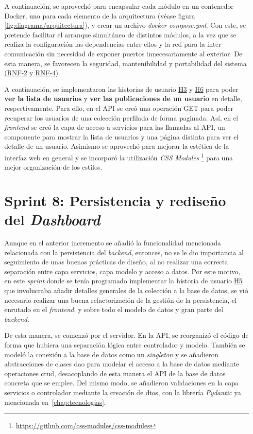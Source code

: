 A continuación, se aprovechó para encapsular cada módulo en un contenedor Docker, uno para cada elemento de la arquitectura (véase figura \ref{fig:diagrama/arquitectura}), y crear un archivo \textit{docker-compose.yml}. Con este, se pretende facilitar el arranque simultáneo de distintos módulos, a la vez que se realiza la configuración las dependencias entre ellos y la red para la inter-comunicación sin necesidad de exponer puertos innecesariamente al exterior. De esta manera, se favorecen la seguridad, mantenibilidad y portabilidad del sistema (\hyperref[tab:rnf]{RNF-2} y \hyperref[tab:rnf]{RNF-4}).

A continuación, se implementaron las historias de usuario \hyperref[tab:user-stories]{H3} y \hyperref[tab:user-stories]{H6} para poder \textbf{ver la lista de usuarios} y \textbf{ver las publicaciones de un usuario} en detalle, respectivamente. Para ello, en el API se creó una operación GET para poder recuperar los usuarios de una colección perfilada de forma paginada. Así, en el \textit{frontend} se creó la capa de acceso a servicios para las llamadas al API, un componente para mostrar la lista de usuarios y una página distinta para ver el detalle de un usuario. Asimismo se aprovechó para mejorar la estética de la interfaz web en general y se incorporó la utilización \textit{CSS Modules} \footnote{\url{https://github.com/css-modules/css-modules}} para una mejor organización de los estilos.

\section{Sprint 8: Persistencia y rediseño del \textit{Dashboard}}
Aunque en el anterior incremento se añadió la funcionalidad mencionada relacionada con la persistencia del \textit{backend}, entonces, no se le dio importancia al seguimiento de unas buenas prácticas de diseño, al no realizar una correcta separación entre capa servicios, capa modelo y acceso a datos. Por este motivo, en este \textit{sprint} donde se tenía programado implementar la historia de usuario \hyperref[tab:user-stories]{H5} que involucraba añadir detalles generales de la colección a la base de datos, se vió necesario realizar una buena refactorización de la gestión de la persistencia, el enrutado en el \textit{frontend}, y sobre todo el modelo de datos y gran parte del \textit{backend}.

De esta manera, se comenzó por el servidor. En la API, se reorganizó el código de forma que hubiera una separación lógica entre controlador y modelo. También se modeló la conexión a la base de datos como un \textit{singleton} y se añadieron abstracciones de clases \acrshort{dao} para modelar el acceso a la base de datos mediante operaciones \acrshort{crud}, desacoplando de esta manera el API de la base de datos concreta que se emplee. Del mismo modo, se añadieron validaciones en la capa servicios o controlador mediante la creación de \acrshort{dto}s, con la librería \textit{Pydantic} ya mencionada en~\ref{chap:tecnologias}.

